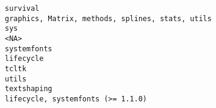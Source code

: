 \documentclass[
  letterpaper,
  DIV=11,
  numbers=noendperiod]{scrreprt}
\begin{document}
\begin{verbatim}
survival                                                                                                                                                                                                                                                                                                                                                                                                                                                                                                                                                                  graphics, Matrix, methods, splines, stats, utils
sys                                                                                                                                                                                                                                                                                                                                                                                                                                                                                                                                                                                                                   <NA>
systemfonts                                                                                                                                                                                                                                                                                                                                                                                                                                                                                                                                                                                                      lifecycle
tcltk                                                                                                                                                                                                                                                                                                                                                                                                                                                                                                                                                                                                                utils
textshaping                                                                                                                                                                                                                                                                                                                                                                                                                                                                                                                                                                              lifecycle, systemfonts (>= 1.1.0)

\end{verbatim}
\end{document}
